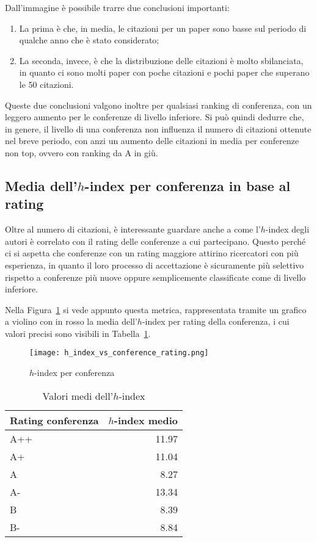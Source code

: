 Dall'immagine è possibile trarre due conclusioni importanti:
\begin{enumerate}
  \item La prima è che, in media, le citazioni per un paper sono basse sul
        periodo di qualche anno che è stato considerato;
  \item La seconda, invece, è che la distribuzione delle citazioni è molto sbilanciata,
        in quanto ci sono molti paper con poche citazioni e pochi paper che superano
        le 50 citazioni.
\end{enumerate}

Queste due conclusioni valgono inoltre per qualsiasi ranking di conferenza,
con un leggero aumento per le conferenze di livello inferiore.
Si può quindi dedurre che, in genere, il livello di una conferenza non influenza
il numero di citazioni ottenute nel breve periodo, con anzi
un aumento delle citazioni in media per conferenze non top, ovvero con ranking
da A in giù.

\subsection{Media dell'$h$-index per conferenza in base al rating}

Oltre al numero di citazioni, è interessante guardare anche
a come l'$h$-index degli autori è correlato con il rating delle conferenze
a cui partecipano. Questo perché ci si aspetta che conferenze con un rating
maggiore attirino ricercatori con più esperienza, in quanto il loro
processo di accettazione è sicuramente più selettivo rispetto a conferenze
più nuove oppure semplicemente classificate come di livello inferiore.

Nella Figura~\ref{fig:h-index-vs-rating} si vede appunto questa metrica,
rappresentata tramite un grafico a violino con in rosso la media dell'$h$-index
per rating della conferenza, i cui valori precisi sono visibili in
Tabella~\ref{table:h-index-vs-rating}.

\begin{figure}[tb]
  \centering
  \texttt{[image: h\_index\_vs\_conference\_rating.png]}
  \caption{$h$-index per conferenza}
  \label{fig:h-index-vs-rating}
\end{figure}

\begin{table}[tb]
  \centering
  \begin{tabular}{||l|r||}
    \hline
    \textbf{Rating conferenza} & \textbf{$h$-index medio} \\ [0.5ex] 
    \hline\hline
    A++    & 11.97 \\ \hline
    A+     & 11.04 \\ \hline
    A      & 8.27  \\ \hline
    A-     & 13.34 \\ \hline
    B      & 8.39 \\ \hline
    B-     & 8.84 \\ \hline
  \end{tabular}
  \caption{Valori medi dell'$h$-index}
  \label{table:h-index-vs-rating}
\end{table}

